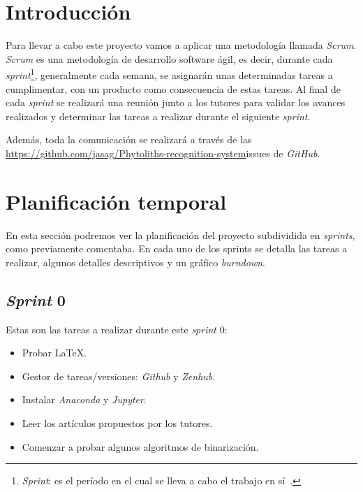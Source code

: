 
\section{Introducción}
Para llevar a cabo este proyecto vamos a aplicar una metodología llamada \textit{Scrum}. \textit{Scrum} es una metodología de desarrollo software ágil, es decir, durante cada \textit{sprint}\footnote{\textit{Sprint}: es el período en el cual se lleva a cabo el trabajo en sí~\cite{wiki:scrum}.}, generalmente cada semana, se asignarán unas determinadas tareas a cumplimentar, con un producto como consecuencia de estas tareas. Al final de cada \textit{sprint} se realizará una reunión junto a los tutores para validar los avances realizados y determinar las tareas a realizar durante el siguiente \textit{sprint}.

Además, toda la comunicación se realizará a través de las \url{https://github.com/jasag/Phytoliths-recognition-system}{issues} de \textit{GitHub}.

\section{Planificación temporal}

En esta sección podremos ver la planificación del proyecto subdividida en \textit{sprints}, como previamente comentaba. En cada uno de los sprints se detalla las tareas a realizar, algunos detalles descriptivos y un gráfico \textit{burndown}.


\subsection{\textit{Sprint} 0}
Estas son las tareas a realizar durante este \textit{sprint} 0:

\begin{itemize}
	\item Probar \LaTeX.
	\item Gestor de tareas/versiones: \textit{Github} y \textit{Zenhub}.
	\item Instalar \textit{Anaconda} y \textit{Jupyter}.
	\item Leer los artículos propuestos por los tutores.
	\item Comenzar a probar algunos algoritmos de binarización.
\end{itemize}


